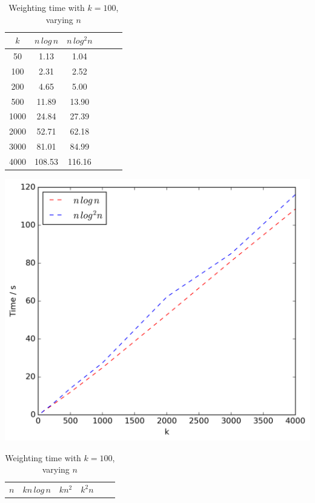 \documentclass{article}
\begin{document}
\begin{table}[!ht]
\begin{minipage}{0.48\textwidth}
            \centering
            \caption{\texttt{Filter\_Clusters} time with $n = 1000$, varying $k$}
            \label{tab:filterk1}
            \begin{tabular}{c||ccccc}
                $k$ & $n\,log\,n$ & $n\,log^2n$\\
                \hline\hline
                50 & 1.13 & 1.04\\
                100 & 2.31 & 2.52\\
                200 & 4.65 & 5.00\\
                500 & 11.89 & 13.90\\
                1000 & 24.84 & 27.39\\
                2000 & 52.71 & 62.18\\
                3000 & 81.01 & 84.99\\
                4000 & 108.53 & 116.16\\
            \end{tabular}
            \includegraphics[scale=0.4]{varyingk1_filter}
            \vspace{0.5cm}
        \end{minipage}
        \begin{minipage}{0.48\textwidth}
            \centering
            \caption{Weighting time with $k = 100$, varying $n$}
            \label{tab:weightn1}
            \begin{tabular}{c||ccccc}
                $n$ & $kn\,log\,n$ & $kn^2$ & $k^2n$\\

\end{tabular}
\end{minipage}
\end{table}
\end{document}
